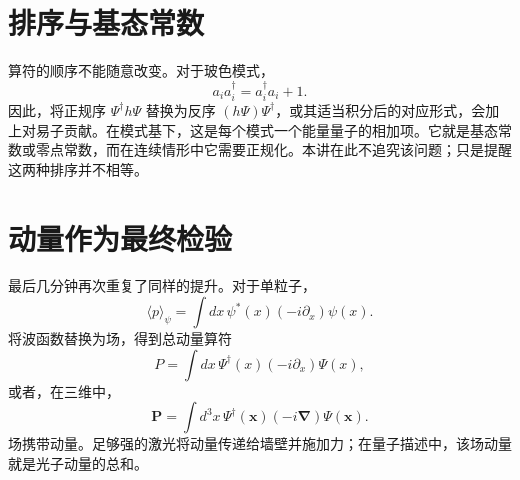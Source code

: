\begin{classroomqa}
\end{classroomqa}

\section{排序与基态常数}

算符的顺序不能随意改变。对于玻色模式，
\begin{equation}
a_i a_i^\dagger=a_i^\dagger a_i+1.
\end{equation}
因此，将正规序 \(\Psi^\dagger h\Psi\) 替换为反序 \((h\Psi)\Psi^\dagger\)，或其适当积分后的对应形式，会加上对易子贡献。在模式基下，这是每个模式一个能量量子的相加项。它就是基态常数或零点常数，而在连续情形中它需要正规化。本讲在此不追究该问题；只是提醒这两种排序并不相等。

\begin{classroomqa}
\end{classroomqa}

\section{动量作为最终检验}

最后几分钟再次重复了同样的提升。对于单粒子，
\begin{equation}
\langle p\rangle_\psi
=\int dx\,\psi^*(x)\left(-i\partial_x\right)\psi(x).
\label{eq:l07-one-particle-momentum}
\end{equation}
将波函数替换为场，得到总动量算符
\begin{equation}
P=\int dx\,\Psi^\dagger(x)\left(-i\partial_x\right)\Psi(x),
\label{eq:l07-field-momentum}
\end{equation}
或者，在三维中，
\begin{equation}
\mathbf P=\int d^3x\,\Psi^\dagger(\mathbf x)
\left(-i\boldsymbol\nabla\right)\Psi(\mathbf x).
\end{equation}
场携带动量。足够强的激光将动量传递给墙壁并施加力；在量子描述中，该场动量就是光子动量的总和。


